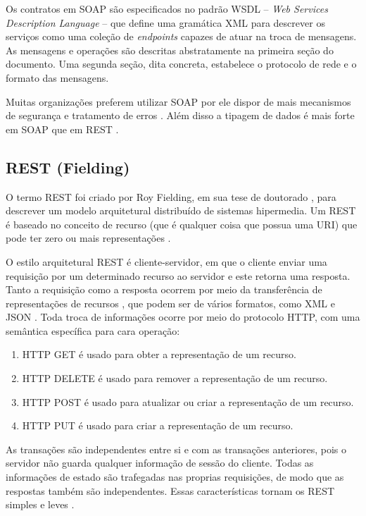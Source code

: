Os contratos em SOAP são especificados no padrão WSDL -- \textit{Web Services
Description Language} -- que define uma gramática XML para descrever os serviços
como uma coleção de \textit{endpoints} capazes de atuar na troca de mensagens.
As mensagens e operações são descritas abstratamente na primeira seção do
documento. Uma segunda seção, dita concreta, estabelece o protocolo de rede e o
formato das mensagens.

Muitas organizações preferem utilizar SOAP por ele dispor de mais mecanismos de
segurança e tratamento de erros \cite{serrano2014service}. Além disso a tipagem
de dados é mais forte em SOAP que em REST \cite{mumbaikar2013web}.


\subsection{REST (Fielding)}
\label{secaoREST}
\vspace{-6mm}

O termo REST foi criado por Roy Fielding, em sua tese de doutorado
\cite{fielding2000architectural}, para descrever um modelo arquitetural
distribuído de sistemas hipermedia. Um \ws{} REST é baseado no conceito de
recurso (que é qualquer coisa que possua uma URI) que pode ter zero ou mais
representações \cite{he2003service}.

O estilo arquitetural REST é cliente-servidor, em que o cliente enviar uma
requisição por um determinado recurso ao servidor e este retorna uma resposta.
Tanto a requisição como a resposta ocorrem por meio da transferência de
representações de recursos \cite{mumbaikar2013web}, que podem ser de vários
formatos, como XML e JSON \cite{serrano2014service}. Toda troca de informações
ocorre por meio do protocolo HTTP, com uma semântica específica para cara
operação:

\begin{enumerate}
\item HTTP GET é usado para obter a representação de um recurso.
\item HTTP DELETE é usado para remover a representação de um recurso.
\item HTTP POST é usado para atualizar ou criar a representação de um recurso.
\item HTTP PUT é usado para criar a representação de um recurso.
\end{enumerate}

As transações são independentes entre si e com as transações anteriores, pois o
servidor não guarda qualquer informação de sessão do cliente. Todas as
informações de estado são trafegadas nas proprias requisições, de modo que as
respostas também são independentes. Essas características tornam os \wss{} REST
simples e leves \cite{mumbaikar2013web}.

